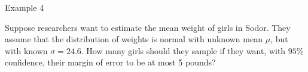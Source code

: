 \documentclass[
  ignorenonframetext,
]{beamer}
\begin{document}
\begin{frame}{Example 4}
\label{example-4}
\begin{tcolorbox}
Suppose researchers want to estimate the mean weight of girls in Sodor. They assume that the distribution of weights is normal with unknown mean $\mu$, but with known $\sigma=24.6$. How many girls should they sample if they want, with $95\%$ confidence, their margin of error to be at most 5 pounds?
\end{tcolorbox}

\begin{tcolorbox}


\vspace{30mm}

\end{tcolorbox}
\end{frame}
\end{document}
